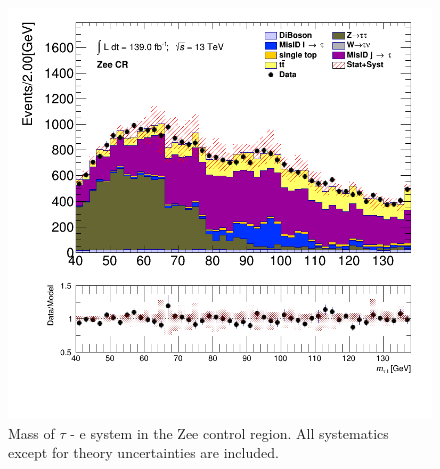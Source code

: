 		\begin{figure}[!thp]
			\centering
			\includegraphics[width=.5\textwidth,keepaspectratio=true]{chapters/chapter6_HPlus/images/taulep/tau_0_lep_0_mass_ZEE.png}
			\caption{Mass of $\tau$ - e system in the Zee control region. All systematics except for \ttbar theory uncertainties are included.}
			\label{fig:zee-mass}
		\end{figure}

